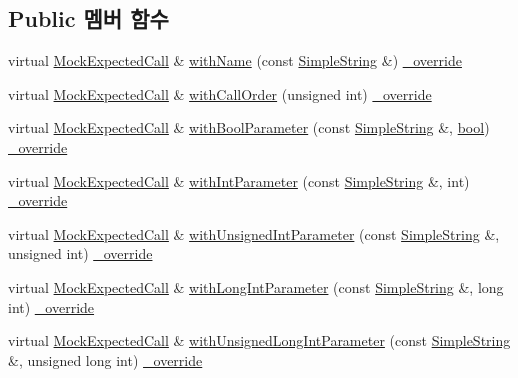 \subsection*{Public 멤버 함수}
\begin{DoxyCompactItemize}
\item 
virtual \hyperlink{class_mock_expected_call}{Mock\+Expected\+Call} \& \hyperlink{class_mock_ignored_expected_call_a46c239e41ca1446969f87b563183adb5}{with\+Name} (const \hyperlink{class_simple_string}{Simple\+String} \&) \hyperlink{_cpp_u_test_config_8h_a049bea15dd750e15869863c94c1efc3b}{\+\_\+override}
\item 
virtual \hyperlink{class_mock_expected_call}{Mock\+Expected\+Call} \& \hyperlink{class_mock_ignored_expected_call_ae80c416462af062baab8a457772b8a7f}{with\+Call\+Order} (unsigned int) \hyperlink{_cpp_u_test_config_8h_a049bea15dd750e15869863c94c1efc3b}{\+\_\+override}
\item 
virtual \hyperlink{class_mock_expected_call}{Mock\+Expected\+Call} \& \hyperlink{class_mock_ignored_expected_call_a37b81fc728b0e00f1641c3d01c260b5d}{with\+Bool\+Parameter} (const \hyperlink{class_simple_string}{Simple\+String} \&, \hyperlink{avb__gptp_8h_af6a258d8f3ee5206d682d799316314b1}{bool}) \hyperlink{_cpp_u_test_config_8h_a049bea15dd750e15869863c94c1efc3b}{\+\_\+override}
\item 
virtual \hyperlink{class_mock_expected_call}{Mock\+Expected\+Call} \& \hyperlink{class_mock_ignored_expected_call_a7da98c634271aff9db5f2c73dc6c3eb0}{with\+Int\+Parameter} (const \hyperlink{class_simple_string}{Simple\+String} \&, int) \hyperlink{_cpp_u_test_config_8h_a049bea15dd750e15869863c94c1efc3b}{\+\_\+override}
\item 
virtual \hyperlink{class_mock_expected_call}{Mock\+Expected\+Call} \& \hyperlink{class_mock_ignored_expected_call_a7eb4bfd9e2fb9146f9ff5a2934c787db}{with\+Unsigned\+Int\+Parameter} (const \hyperlink{class_simple_string}{Simple\+String} \&, unsigned int) \hyperlink{_cpp_u_test_config_8h_a049bea15dd750e15869863c94c1efc3b}{\+\_\+override}
\item 
virtual \hyperlink{class_mock_expected_call}{Mock\+Expected\+Call} \& \hyperlink{class_mock_ignored_expected_call_a3d22f11dc655e805fcb1fb55bff78076}{with\+Long\+Int\+Parameter} (const \hyperlink{class_simple_string}{Simple\+String} \&, long int) \hyperlink{_cpp_u_test_config_8h_a049bea15dd750e15869863c94c1efc3b}{\+\_\+override}
\item 
virtual \hyperlink{class_mock_expected_call}{Mock\+Expected\+Call} \& \hyperlink{class_mock_ignored_expected_call_a887fa132c31cb8e591fe8255137d3446}{with\+Unsigned\+Long\+Int\+Parameter} (const \hyperlink{class_simple_string}{Simple\+String} \&, unsigned long int) \hyperlink{_cpp_u_test_config_8h_a049bea15dd750e15869863c94c1efc3b}{\+\_\+override}

\end{DoxyCompactItemize}
